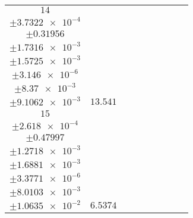 \documentclass[8pt]{article}
\begin{document}
\begin{longtable}[l]{c c c c c c c c c}
$\num{14}$ & \begin{tabular}[c]{@{}c@{}}$\num{7.6377e-2}$ \\ $\pm\num{3.7322e-4}$\end{tabular} & \begin{tabular}[c]{@{}c@{}}$\num{1.0388}$ \\ $\pm\num{0.31956}$\end{tabular} & \begin{tabular}[c]{@{}c@{}}$\num{4.3006}$ \\ $\pm\num{1.7316e-3}$\end{tabular} & \begin{tabular}[c]{@{}c@{}}$\num{3.5873e+3}$ \\ $\pm\num{1.5725e-3}$\end{tabular} & \begin{tabular}[c]{@{}c@{}}$\num{7.1765}$ \\ $\pm\num{3.146e-6}$\end{tabular} & \begin{tabular}[c]{@{}c@{}}$\num{1.5126}$ \\ $\pm\num{8.37e-3}$\end{tabular} & \begin{tabular}[c]{@{}c@{}}$\num{1.3529}$ \\ $\pm\num{9.1062e-3}$\end{tabular} & $\num{13.541}$\\
$\num{15}$ & \begin{tabular}[c]{@{}c@{}}$\num{3.1181e-2}$ \\ $\pm\num{2.618e-4}$\end{tabular} & \begin{tabular}[c]{@{}c@{}}$\num{0.28588}$ \\ $\pm\num{0.47997}$\end{tabular} & \begin{tabular}[c]{@{}c@{}}$\num{-8.2037}$ \\ $\pm\num{1.2718e-3}$\end{tabular} & \begin{tabular}[c]{@{}c@{}}$\num{3.6185e+3}$ \\ $\pm\num{1.6881e-3}$\end{tabular} & \begin{tabular}[c]{@{}c@{}}$\num{7.239}$ \\ $\pm\num{3.3771e-6}$\end{tabular} & \begin{tabular}[c]{@{}c@{}}$\num{0.7645}$ \\ $\pm\num{8.0103e-3}$\end{tabular} & \begin{tabular}[c]{@{}c@{}}$\num{0.77816}$ \\ $\pm\num{1.0635e-2}$\end{tabular} & $\num{6.5374}$\\

\end{longtable}
\end{document}
